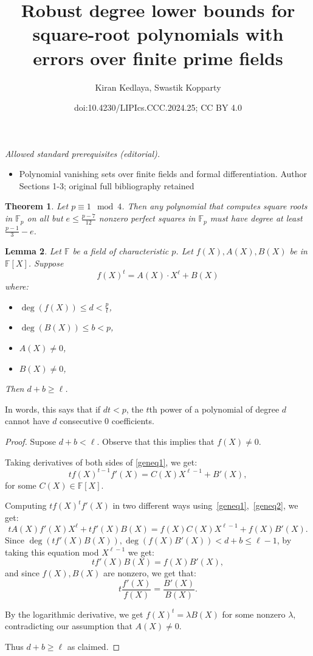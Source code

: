 \documentclass[10pt,a4paper]{article}
\title{Robust degree lower bounds for square-root polynomials with errors over finite prime fields}
\author{Kiran Kedlaya, Swastik Kopparty}
\date{doi:10.4230/LIPIcs.CCC.2024.25; CC BY 4.0}
\newtheorem{theorem}{Theorem}[section]
\newtheorem{lemma}[theorem]{Lemma}
\newcommand{\F}{\mathbb{F}}
\begin{document}
\maketitle
\setcounter{section}{1}
\noindent\textit{Allowed standard prerequisites (editorial).}\begin{itemize}
\item Polynomial vanishing sets over finite fields and formal differentiation. Author Sections 1-3; original full bibliography retained
\end{itemize}\medskip
\begin{theorem}
\label{thm:1mod4robust}
 Let $p \equiv 1 \mod 4$. Then any polynomial that computes square roots in $\F_p$ on all but $e \leq \frac{p-7}{12}$ nonzero perfect squares in $\F_p$ must have degree at least $\frac{p-1}{3} - e$.
\end{theorem}

\begin{lemma}
\label{lemgen}
Let $\F$ be a field of characteristic $p$.
Let $f(X), A(X), B(X)$ be in $\F[X]$. 
 Suppose
 \begin{equation}
 \label{geneq1}
    f(X)^t = A(X) \cdot X^\ell + B(X)
 \end{equation}
 where:
 \begin{itemize}
  \item $\deg(f(X)) \leq d < \frac{p}{t}$,
  \item $\deg(B(X)) \leq b < p$,
  \item $A(X) \neq 0$,
  \item $B(X) \neq 0$,
\end{itemize}
Then $d + b \geq \ell$.
\end{lemma}
In words, this says that if $dt < p$, the $t$th power of a polynomial of degree $d$ cannot have $d$ consecutive $0$ coefficients.
\begin{proof}
Supose $d + b < \ell$. Observe that this implies that $f(X) \neq 0$.

 Taking derivatives of both sides of \eqref{geneq1}, we get:
 \begin{equation}
  \label{geneq2}
  t f(X)^{t-1} f'(X) = C(X) X^{\ell-1} + B'(X),
 \end{equation}
 for some $C(X) \in \F[X]$. 
 
 Computing $t f(X)^t f'(X)$ in two different ways using~\eqref{geneq1},~\eqref{geneq2}, we get:
 $$ t A(X) f'(X) X^{\ell} + t f'(X) B(X) = f(X) C(X) X^{\ell-1} + f(X) B'(X).$$
 Since $\deg(t f'(X) B(X)), \deg(f(X) B'(X)) < d+b \leq \ell - 1$,
 by taking this equation mod $X^{\ell-1}$ we get:
 $$ t f'(X) B(X) = f(X) B'(X),$$
 and since $f(X), B(X)$ are nonzero, we get that:
 $$ t \frac{f'(X)}{f(X)} = \frac{B'(X)}{B(X)}.$$
 
 By the logarithmic derivative, we get $f(X)^t = \lambda B(X)$ for some nonzero $\lambda$, contradicting our assumption that $A(X) \neq 0$.

 Thus $d+ b \geq \ell$ as claimed.
\end{proof}
\end{document}
